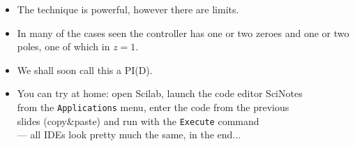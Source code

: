 \begin{frame}
\myPause
 \begin{itemize}[<+-| alert@+>]
 \item The technique is powerful, however there are  limits.
 \item In many of the cases seen the controller has one or two zeroes and one or two poles, 
       one of which in $z=1$.
 \item We shall soon call this a PI(D).
 \item \vfill You can try at home: open Scilab, launch the code editor SciNotes\\
       from the \texttt{Applications} menu, enter the code from the previous\\
       slides (copy{\&}paste) and run with the \texttt{Execute} command\\
       --- all IDEs look pretty much the same, in the end...
 \end{itemize}
\end{frame}
